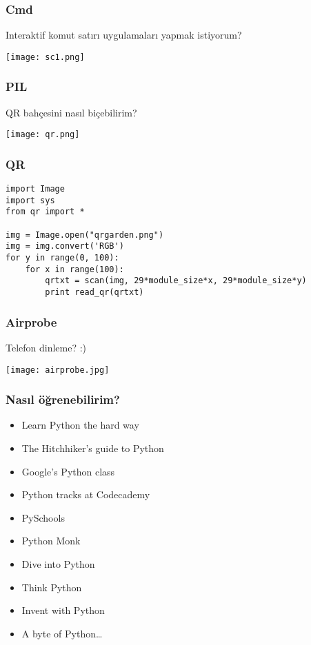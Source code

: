\documentclass[10pt, compress]{beamer}
\begin{document}

\begin{frame}[fragile]
    \frametitle{Cmd}
    \begin{center}
         Interaktif komut satırı uygulamaları yapmak istiyorum?
    \end{center}  
      \texttt{[image: sc1.png]}
\end{frame}

\begin{frame}[fragile]
    \frametitle{PIL}
    \begin{center}
         QR bahçesini nasıl biçebilirim?
    \end{center}  
      \texttt{[image: qr.png]}
\end{frame}

\begin{frame}[fragile]
    \frametitle{QR}
    \begin{center}
      \begin{verbatim}
import Image
import sys
from qr import *

img = Image.open("qrgarden.png")
img = img.convert('RGB')
for y in range(0, 100):
    for x in range(100):
        qrtxt = scan(img, 29*module_size*x, 29*module_size*y)
        print read_qr(qrtxt)
      \end{verbatim}
      \end{center}  
\end{frame}

\begin{frame}[fragile]
    \frametitle{Airprobe}
    \begin{center}
         Telefon dinleme? :)
    \end{center}  
      \texttt{[image: airprobe.jpg]}
\end{frame}

\begin{frame}[fragile]
    \frametitle{Nasıl öğrenebilirim?}
    \begin{itemize}
        \item Learn Python the hard way
        \item The Hitchhiker’s guide to Python
        \item Google’s Python class
        \item Python tracks at Codecademy
        \item PySchools
        \item Python Monk
        \item Dive into Python
        \item Think Python
        \item Invent with Python
        \item A byte of Python\ldots
    \end{itemize}  
\end{frame}
\end{document}
